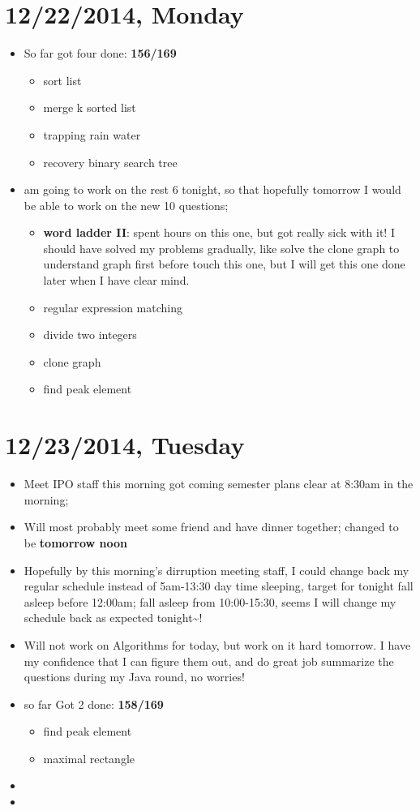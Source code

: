\documentclass[9pt,b5paper]{article}
\begin{document}
\section{12/22/2014, Monday}
\label{sec-3}
\begin{itemize}
\item So far got four done: \textbf{156/169}
\begin{itemize}
\item sort list
\item merge k sorted list
\item trapping rain water
\item recovery binary search tree
\end{itemize}
\item am going to work on the rest 6 tonight, so that hopefully tomorrow I would be able to work on the new 10 questions;
\begin{itemize}
\item \textbf{word ladder II}: spent hours on this one, but got really sick with it! I should have solved my problems gradually, like solve the clone graph to understand graph first before touch this one, but I will get this one done later when I have clear mind.
\item regular expression matching
\item divide two integers
\item clone graph
\item find peak element
\end{itemize}
\end{itemize}
\section{12/23/2014, Tuesday}
\label{sec-4}
\begin{itemize}
\item Meet IPO staff this morning got coming semester plans clear at 8:30am in the morning;
\item Will most probably meet some friend and have dinner together; changed to be \textbf{tomorrow noon}
\item Hopefully by this morning's dirruption meeting staff, I could change back my regular schedule instead of 5am-13:30 day time sleeping, target for tonight fall asleep before 12:00am; fall asleep from 10:00-15:30, seems I will change my schedule back as expected tonight\textasciitilde{}!
\item Will not work on Algorithms for today, but work on it hard tomorrow. I have my confidence that I can figure them out, and do great job summarize the questions during my Java round, no worries!
\item so far Got 2 done: \textbf{158/169}
\begin{itemize}
\item find peak element
\item maximal rectangle
\end{itemize}
\item 
\item 
\end{itemize}
\end{document}
